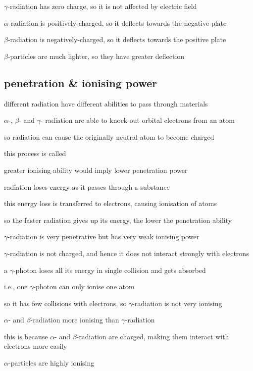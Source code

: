 \begin{soln} $\gamma$-radiation has zero charge, so it is not affected by electric field

$\alpha$-radiation is positively-charged, so it deflects towards the negative plate

$\beta$-radiation is negatively-charged, so it deflects towards the positive plate

$\beta$-particles are much lighter, so they have greater deflection \end{soln}


\subsection*{penetration \& ionising power}

different radiation have different abilities to pass through materials

$\alpha$-, $\beta$- and $\gamma$- radiation are able to knock out orbital electrons from an atom

so radiation can cause the originally neutral atom to become charged

this process is called 

\cmt greater ionising ability would imply lower penetration power

radiation loses energy as it passes through a substance

this energy loss is transferred to electrons, causing ionisation of atoms

so the faster radiation gives up its energy, the lower the penetration ability

\cmt $\gamma$-radiation is very penetrative but has very weak ionising power 

$\gamma$-radiation is not charged, and hence it does not interact strongly with electrons

a $\gamma$-photon loses all its energy in single collision and gets absorbed

i.e., one $\gamma$-photon can only ionise one atom

so it has few collisions with electrons, so $\gamma$-radiation is not very ionising

\cmt $\alpha$- and $\beta$-radiation more ionising than $\gamma$-radiation

this is because $\alpha$- and $\beta$-radiation are charged, making them interact with electrons more easily

\cmt $\alpha$-particles are highly ionising

